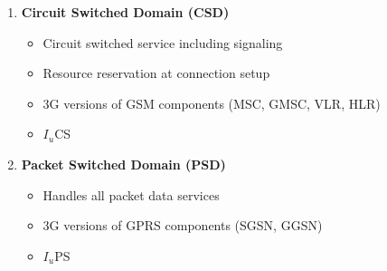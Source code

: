 \begin{enumerate}
	\item \textbf{Circuit Switched Domain (CSD)}
	\begin{itemize}
		\item Circuit switched service including signaling
		\item Resource reservation at connection setup
		\item 3G versions of GSM components (MSC, GMSC, VLR, HLR)
		\item $ I_u$CS
	\end{itemize}
	
	\item \textbf{Packet Switched Domain (PSD)}
	\begin{itemize}
		\item Handles all packet data services
		\item 3G versions of GPRS components (SGSN, GGSN)
		\item $ I_u $PS
	\end{itemize}

\end{enumerate}
%	
%	
%


